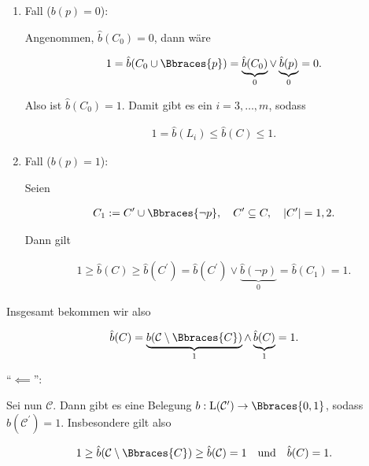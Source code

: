 \begin{solution}
\begin{enumerate}[label = \arabic*.]

    \item Fall ($b(p) = 0$):
    
    Angenommen, $\hat b(C_0) = 0$, dann wäre

    \begin{align*}
        1
        =
        \hat b(C_0 \cup \Bbraces{p})
        =
        \underbrace{\hat b(C_0)}_0
        \lor
        \underbrace{\hat b(p)}_0
        =
        0.
    \end{align*}

    Also ist $\hat b(C_0) = 1$.
    Damit gibt es ein $i = 3, \dots, m$, sodass

    \begin{align*}
        1 = \hat b(L_i) \leq \hat b(C) \leq 1.
    \end{align*}

    \item Fall ($b(p) = 1$):
    
    Seien

    \begin{align*}
        C_1 := C^\prime \cup \Bbraces{\neg p},
        \quad
        C^\prime \subseteq C,
        \quad
        |C^\prime| = 1, 2.
    \end{align*}

    Dann gilt

    \begin{align*}
        1
        \geq
        \hat b(C)
        \geq
        \hat b(C^\prime)
        =
        \hat b(C^\prime)
        \lor \underbrace{\hat b(\neg p)}_0
        =
        \hat b(C_1)
        =
        1.
    \end{align*}

\end{enumerate}

Insgesamt bekommen wir also 

\begin{align*}
    \hat b(C)
    =
    \underbrace{b(\mathcal C \setminus \Bbraces{C})}_1
    \land
    \underbrace{\hat b(C)}_1
    =
    1.
\end{align*}

\enquote{$\impliedby$}:

Sei nun $\mathcal C$.
Dann gibt es eine Belegung $b: \operatorname L(\mathcal C^\prime) \to \Bbraces{0, 1}$, sodass $\hat b(\mathcal C^\prime) = 1$.
Insbesondere gilt also

\begin{align*}
    1 \geq \hat b(\mathcal C \setminus \Bbraces{C}) \geq \hat b(\mathcal C) = 1
    \quad
    \text{und}
    \quad
    \hat b(C) = 1.
\end{align*}


\end{solution}
